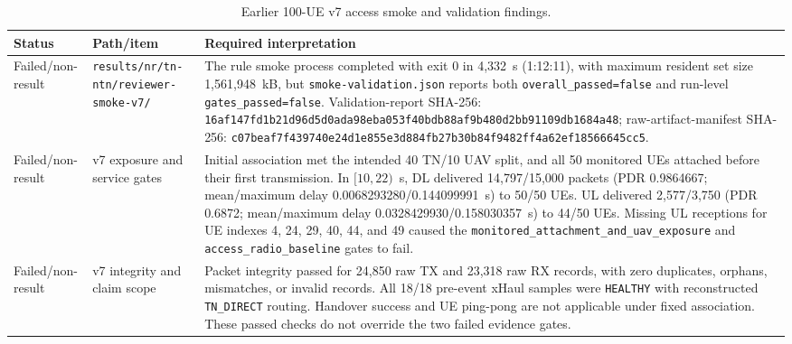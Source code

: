 \begin{table}[t]
\centering
\footnotesize
\caption{Earlier 100-UE v7 access smoke and validation findings.}
\label{tab:audited_v7_attempt}
\begin{tabular}{p{} p{} p{}}
\hline
Status & Path/item & Required interpretation \\
\hline
Failed/non-result & \texttt{results/\allowbreak nr/\allowbreak tn-\allowbreak ntn/\allowbreak reviewer-\allowbreak smoke-\allowbreak v7/\allowbreak } & The rule smoke process completed with exit 0 in 4,332~s (1:12:11), with maximum resident set size 1,561,948~kB, but \texttt{smoke-\allowbreak validation.json} reports both \texttt{overall\_\allowbreak passed=false} and run-level \texttt{gates\_\allowbreak passed=false}.  Validation-report SHA-256: \texttt{16af147fd1b21d96\allowbreak d5d0ada98eba053f\allowbreak 40bdb88af9b480d2\allowbreak bb91109db1684a48}; raw-artifact-manifest SHA-256: \texttt{c07beaf7f439740e\allowbreak 24d1e855e3d884fb\allowbreak 27b30b84f9482ff4\allowbreak a62ef18566645cc5}. \\
Failed/non-result & v7 exposure and service gates & Initial association met the intended 40 TN/10 UAV split, and all 50 monitored UEs attached before their first transmission.  In $[10,22)$~s, DL delivered 14,797/15,000 packets (PDR 0.9864667; mean/maximum delay 0.0068293280/0.144099991~s) to 50/50 UEs.  UL delivered 2,577/3,750 (PDR 0.6872; mean/maximum delay 0.0328429930/0.158030357~s) to 44/50 UEs.  Missing UL receptions for UE indexes 4, 24, 29, 40, 44, and 49 caused the \texttt{monitored\_\allowbreak attachment\_\allowbreak and\_\allowbreak uav\_\allowbreak exposure} and \texttt{access\_\allowbreak radio\_\allowbreak baseline} gates to fail. \\
Failed/non-result & v7 integrity and claim scope & Packet integrity passed for 24,850 raw TX and 23,318 raw RX records, with zero duplicates, orphans, mismatches, or invalid records.  All 18/18 pre-event xHaul samples were \texttt{HEALTHY} with reconstructed \texttt{TN\_DIRECT} routing.  Handover success and UE ping-pong are not applicable under fixed association.  These passed checks do not override the two failed evidence gates. \\
\hline
\end{tabular}
\end{table}

